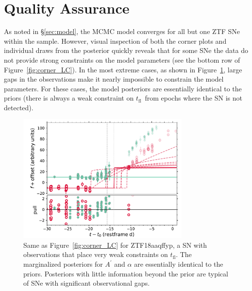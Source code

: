 \documentclass[twocolumn]{./aastex63}
\newcommand{\tfl}{$t_\mathrm{fl}$}
\begin{document}

\appendix

\section{Quality Assurance}\label{sec:qa}

As noted in \S\ref{sec:model}, the MCMC model converges for all but one ZTF
SNe within the sample. However, visual inspection of both the corner plots and
individual draws from the posterior quickly reveals that for some SNe the data
do not provide strong constraints on the model parameters (see the bottom row
of Figure~\ref{fig:corner_LC}). In the most extreme cases, as shown in
Figure~\ref{fig:biggap_lc}, large gaps in the observations make it nearly
impossible to constrain the model parameters. For these cases, the model
posteriors are essentially identical to the priors (there is always a weak
constraint on \tfl\ from epochs where the SN is not detected).

\begin{figure}
    \centering
    \includegraphics[width=3.4in]{./figures/ZTF18aaqffyp_model_lc.pdf}
    \caption{Same as Figure~\ref{fig:corner_LC} for ZTF18aaqffyp, a SN with
    observations that place very weak constraints on \tfl. The marginalized
    posteriors for $A^\prime$ and $\alpha$ are essentially identical to the
    priors. Posteriors with little information beyond the prior are typical
    of SNe with significant observational gaps.}
    \label{fig:biggap_lc}
\end{figure}
\end{document}
